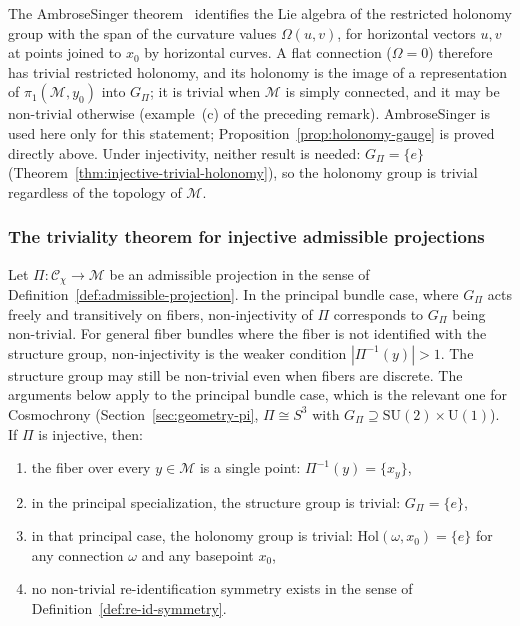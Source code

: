     \begin{remark}
      The Ambrose\textendash Singer theorem~\cite{AmbroseSinger1953} identifies the Lie algebra of the restricted
      holonomy group with the span of the curvature values $\Omega(u,v)$, for horizontal vectors $u, v$ at points
      joined to $x_0$ by horizontal curves.
      A flat connection ($\Omega = 0$) therefore has trivial restricted holonomy, and its holonomy is the image of
      a representation of $\pi_1(\mathcal{M}, y_0)$ into $G_\Pi$; it is trivial when $\mathcal{M}$ is simply
      connected, and it may be non-trivial otherwise (example~(c) of the preceding remark).
      Ambrose\textendash Singer is used here only for this statement; Proposition~\ref{prop:holonomy-gauge} is
      proved directly above.
      Under injectivity, neither result is needed: $G_\Pi = \{e\}$
      (Theorem~\ref{thm:injective-trivial-holonomy}), so the holonomy group is trivial regardless of the topology
      of $\mathcal{M}$.
    \end{remark}

  \subsubsection*{The triviality theorem for injective admissible projections}
    \label{subsec:stepA-triviality}

    \begin{theorem}
      \label{thm:injective-trivial-holonomy}
      Let $\Pi : \mathcal{C}_\chi \to \mathcal{M}$ be an admissible projection in the sense of
      Definition~\ref{def:admissible-projection}.
      In the principal bundle case, where $G_\Pi$ acts freely and transitively on fibers,
      non-injectivity of $\Pi$ corresponds to $G_\Pi$ being non-trivial.
      For general fiber bundles where the fiber is not identified with the structure group,
      non-injectivity is the weaker condition $|\Pi^{-1}(y)| > 1$.
      The structure group may still be non-trivial even when fibers are discrete.
      The arguments below apply to the principal bundle case, which is the relevant one
      for Cosmochrony (Section~\ref{sec:geometry-pi}, $\Pi \cong S^3$ with
      $G_\Pi \supseteq \mathrm{SU}(2) \times \mathrm{U}(1)$).
      If $\Pi$ is injective, then:
      \begin{enumerate}[label=(\alph*)]
  \item \label{thm-a}
  the fiber over every $y \in \mathcal{M}$ is a single point: $\Pi^{-1}(y) = \{x_y\}$,
  \item \label{thm-b}
  in the principal specialization, the structure group is trivial: $G_\Pi = \{e\}$,
  \item \label{thm-c}
  in that principal case, the holonomy group is trivial:
  $\mathrm{Hol}(\omega, x_0) = \{e\}$ for any connection $\omega$ and any basepoint $x_0$,
  \item \label{thm-d}
  no non-trivial re-identification symmetry exists in the sense of Definition~\ref{def:re-id-symmetry}.
      \end{enumerate}
    \end{theorem}

